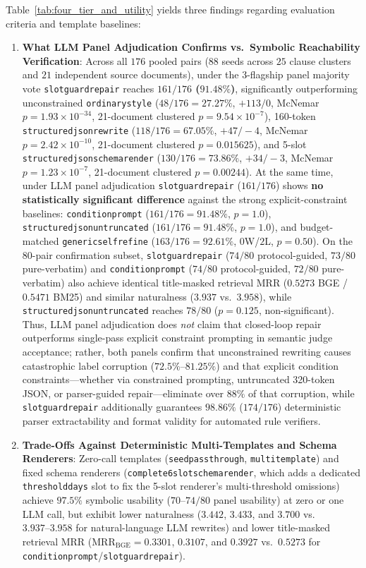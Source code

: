 \documentclass[10pt,twocolumn]{article}
\renewcommand{\_}{\textunderscore\allowbreak}
\begin{document}
Table~\ref{tab:four_tier_and_utility} yields three findings regarding evaluation criteria and template baselines:
\begin{enumerate}[leftmargin=*,nosep]
  \item \textbf{What LLM Panel Adjudication Confirms vs.\ Symbolic Reachability Verification}: Across all $176$ pooled pairs ($88$ seeds across $25$ clause clusters and $21$ independent source documents), under the 3-flagship panel majority vote \texttt{slot\_guard\_repair} reaches \textbf{$161/176$ ($91.48\%$)}, significantly outperforming unconstrained \texttt{ordinary\_style} ($48/176 = 27.27\%$, $+113/0$, McNemar $p = 1.93\times 10^{-34}$, 21-document clustered $p = 9.54\times 10^{-7}$), 160-token \texttt{structured\_json\_rewrite} ($118/176 = 67.05\%$, $+47/-4$, McNemar $p = 2.42\times 10^{-10}$, 21-document clustered $p = 0.015625$), and 5-slot \texttt{structured\_json\_schema\_render} ($130/176 = 73.86\%$, $+34/-3$, McNemar $p = 1.23\times 10^{-7}$, 21-document clustered $p = 0.00244$). At the same time, under LLM panel adjudication \texttt{slot\_guard\_repair} ($161/176$) shows \textbf{no statistically significant difference} against the strong explicit-constraint baselines: \texttt{condition\_prompt} ($161/176 = 91.48\%$, $p = 1.0$), \texttt{structured\_json\_untruncated\_320} ($161/176 = 91.48\%$, $p = 1.0$), and budget-matched \texttt{generic\_self\_refine} ($163/176 = 92.61\%$, $0$W/$2$L, $p = 0.50$). On the 80-pair confirmation subset, \texttt{slot\_guard\_repair} ($74/80$ protocol-guided, $73/80$ pure-verbatim) and \texttt{condition\_prompt} ($74/80$ protocol-guided, $72/80$ pure-verbatim) also achieve identical title-masked retrieval MRR ($0.5273$ BGE / $0.5471$ BM25) and similar naturalness ($3.937$ vs.\ $3.958$), while \texttt{structured\_json\_untruncated\_320} reaches $78/80$ ($p = 0.125$, non-significant). Thus, LLM panel adjudication does \emph{not} claim that closed-loop repair outperforms single-pass explicit constraint prompting in semantic judge acceptance; rather, both panels confirm that unconstrained rewriting causes catastrophic label corruption ($72.5\%\text{--}81.25\%$) and that explicit condition constraints—whether via constrained prompting, untruncated 320-token JSON, or parser-guided repair—eliminate over $88\%$ of that corruption, while \texttt{slot\_guard\_repair} additionally guarantees $98.86\%$ ($174/176$) deterministic parser extractability and format validity for automated rule verifiers.
  \item \textbf{Trade-Offs Against Deterministic Multi-Templates and Schema Renderers}: Zero-call templates (\texttt{seed\_passthrough}, \texttt{multi\_template\_3}) and fixed schema renderers (\texttt{complete\_6slot\_schema\_render}, which adds a dedicated \texttt{threshold\_days} slot to fix the 5-slot renderer's multi-threshold omissions) achieve $97.5\%$ symbolic usability ($70\text{--}74/80$ panel usability) at zero or one LLM call, but exhibit lower naturalness ($3.442$, $3.433$, and $3.700$ vs.\ $3.937\text{--}3.958$ for natural-language LLM rewrites) and lower title-masked retrieval MRR ($\text{MRR}_{\text{BGE}} = 0.3301$, $0.3107$, and $0.3927$ vs.\ $0.5273$ for \texttt{condition\_prompt}/\texttt{slot\_guard\_repair}).

\end{enumerate}
\end{document}
